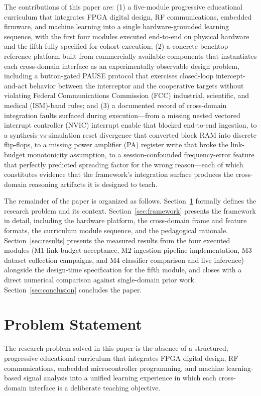 \documentclass[conference]{IEEEtran}
\begin{document}
The contributions of this paper are: (1) a five-module progressive educational curriculum that integrates FPGA digital design, RF communications, embedded firmware, and machine learning into a single hardware-grounded learning sequence, with the first four modules executed end-to-end on physical hardware and the fifth fully specified for cohort execution; (2) a concrete benchtop reference platform built from commercially available components that instantiates each cross-domain interface as an experimentally observable design problem, including a button-gated PAUSE protocol that exercises closed-loop intercept-and-act behavior between the interceptor and the cooperative targets without violating Federal Communications Commission (FCC) industrial, scientific, and medical (ISM)-band rules; and (3) a documented record of cross-domain integration faults surfaced during execution---from a missing nested vectored interrupt controller (NVIC) interrupt enable that blocked end-to-end ingestion, to a synthesis-vs-simulation reset divergence that converted block RAM into discrete flip-flops, to a missing power amplifier (PA) register write that broke the link-budget monotonicity assumption, to a session-confounded frequency-error feature that perfectly predicted spreading factor for the wrong reason---each of which constitutes evidence that the framework's integration surface produces the cross-domain reasoning artifacts it is designed to teach.

The remainder of the paper is organized as follows. Section~\ref{sec:problem} formally defines the research problem and its context. Section~\ref{sec:framework} presents the framework in detail, including the hardware platform, the cross-domain frame and feature formats, the curriculum module sequence, and the pedagogical rationale. Section~\ref{sec:results} presents the measured results from the four executed modules (M1 link-budget acceptance, M2 ingestion-pipeline implementation, M3 dataset collection campaigns, and M4 classifier comparison and live inference) alongside the design-time specification for the fifth module, and closes with a direct numerical comparison against single-domain prior work. Section~\ref{sec:conclusion} concludes the paper.

\section{Problem Statement}\label{sec:problem}

The research problem solved in this paper is the absence of a structured, progressive educational curriculum that integrates FPGA digital design, RF communications, embedded microcontroller programming, and machine learning-based signal analysis into a unified learning experience in which each cross-domain interface is a deliberate teaching objective.
\end{document}
